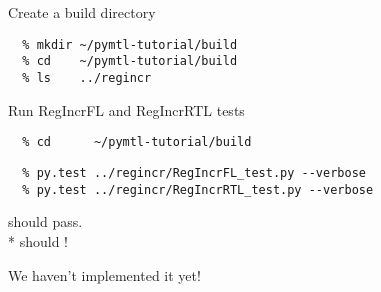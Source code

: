 
\section[{\it Hands-On} RegIncr]{}

\begin{task}\begin{frame}[fragile]{Create a build directory}
\medskip
\begin{verbatim}
  % mkdir ~/pymtl-tutorial/build
  % cd    ~/pymtl-tutorial/build
  % ls    ../regincr
\end{verbatim}

\end{frame}
\end{task}

\begin{task}\begin{frame}[fragile]{Run RegIncrFL and RegIncrRTL tests}
\medskip
\begin{verbatim}
  % cd      ~/pymtl-tutorial/build
\end{verbatim}

\begin{verbatim}
  % py.test ../regincr/RegIncrFL_test.py --verbose
  % py.test ../regincr/RegIncrRTL_test.py --verbose
\end{verbatim}

\begin{centering}
 should pass. \\*
 should !

\vspace{0.4in}
We haven't implemented it yet!

\end{centering}

\end{frame}
\end{task}

